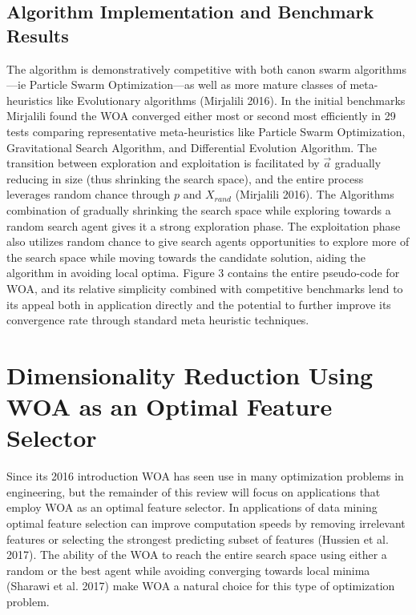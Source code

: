 \documentclass[11pt]{article}
\begin{document}
{\subsection*{Algorithm Implementation and Benchmark Results} {
    The algorithm is demonstratively competitive with both canon swarm algorithms---ie Particle Swarm Optimization---as well as more mature classes of meta-heuristics like Evolutionary algorithms (Mirjalili 2016).
    In the initial benchmarks Mirjalili found the WOA converged either most or second most efficiently in 29 tests comparing representative meta-heuristics like Particle Swarm Optimization, Gravitational Search Algorithm, and Differential Evolution Algorithm.
    The transition between exploration and exploitation is facilitated by $\vec{a}$ gradually reducing in size (thus shrinking the search space), and the entire process leverages random chance through $p$ and $X_{rand}$ (Mirjalili 2016).
    The Algorithms combination of gradually shrinking the search space while exploring towards a random search agent gives it a strong exploration phase.
    The exploitation phase also utilizes random chance to give search agents opportunities to explore more of the search space while moving towards the candidate solution, aiding the algorithm in avoiding local optima.
    Figure 3 contains the entire pseudo-code for WOA, and its relative simplicity combined with competitive benchmarks lend to its appeal both in application directly and the potential to further improve its convergence rate through standard meta heuristic techniques.
}

\section*{Dimensionality Reduction Using WOA as an Optimal Feature Selector} {
    Since its 2016 introduction WOA has seen use in many optimization problems in engineering, but the remainder of this review will focus on applications that employ WOA as an optimal feature selector.
    In applications of data mining optimal feature selection can improve computation speeds by removing irrelevant features or selecting the strongest predicting subset of features (Hussien et al. 2017).
    The ability of the WOA to reach the entire search space using either a random or the best agent while avoiding converging towards local minima (Sharawi et al. 2017) make WOA a natural choice for this type of optimization problem.

}}
\end{document}
